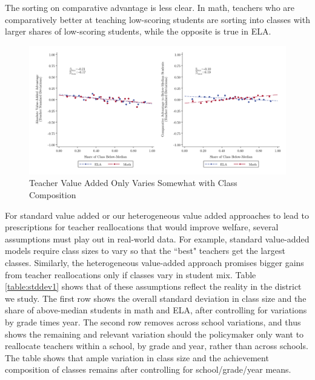 \documentclass[12pt]{article}
\theoremstyle{definition}
\theoremstyle{definition}
\theoremstyle{definition}
\theoremstyle{definition}
\begin{document}
The sorting on comparative advantage is less clear. In math, teachers who are comparatively better at teaching low-scoring students are sorting into classes with larger shares of low-scoring students, while the opposite is true in ELA. 


\begin{figure}[htpb]
\centering
\includegraphics[width=.9\textwidth]{Working_Paper/test_figures/02_pct_low.pdf}
    \caption{Teacher Value Added Only Varies Somewhat with Class Composition}
    \label{fig:squo1}
\end{figure}



For standard value added or our heterogeneous value added approaches to lead to prescriptions for teacher reallocations that would improve welfare, several assumptions must play out in real-world data. For example, standard value-added models require class sizes to vary so that the ``best" teachers get the largest classes. Similarly, the heterogeneous value-added approach promises bigger gains from teacher reallocations only if classes vary in student mix. Table \ref{table:stddev1} shows that of these assumptions reflect the reality in the district we study. The first row shows the overall standard deviation in class size and the share of above-median students in math and ELA, after controlling for variations by grade times year. The second row removes across school variations, and thus shows the remaining and relevant variation should the policymaker only want to reallocate teachers within a school, by grade and year, rather than across schools. The table shows that ample variation in class size and the achievement composition of classes remains after controlling for school/grade/year means. 
\end{document}
